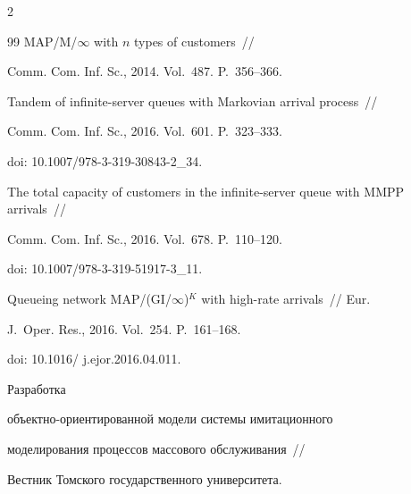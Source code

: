 \begin{multicols}{2}
{{\begin{thebibliography}{99}
MAP/M/$\infty$ with $n$ types of customers~// 


Comm. Com. Inf. Sc., 2014. Vol.~487. P.~356--366.









Tandem of infinite-server queues with Markovian arrival process~// 


Comm. Com. Inf. Sc., 2016. Vol.~601. P.~323--333.


doi: 10.1007/978-3-319-30843-2\_34.









The total capacity of customers in the infinite-server queue with MMPP arrivals~// 


Comm. Com. Inf. Sc., 2016. Vol.~678. P.~110--120.


doi: 10.1007/978-3-319-51917-3\_11.


    












Queueing network MAP/(GI/$\infty$)$^K$ with high-rate arrivals~// Eur. 


J.~Oper. Res., 2016. Vol.~254. P.~161--168.


doi: 10.1016/ j.ejor.2016.04.011.



















 Разработка 


объ\-ект\-но-ори\-ен\-ти\-ро\-ван\-ной модели системы имитационного\linebreak 


моделирования процессов массового обслуживания~// 


Вестник Томского государственного университета. 



\end{thebibliography}}}
\end{multicols}
